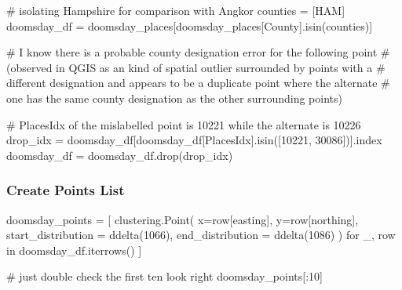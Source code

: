 \documentclass[
  11pt,
  letterpaper,
  DIV=11,
  numbers=noendperiod]{scrartcl}
\newenvironment{Shaded}{\begin{snugshade}}{\end{snugshade}}
\newcommand{\CommentTok}[1]{\textcolor[rgb]{0.37,0.37,0.37}{#1}}
\newcommand{\ControlFlowTok}[1]{\textcolor[rgb]{0.00,0.23,0.31}{#1}}
\newcommand{\DecValTok}[1]{\textcolor[rgb]{0.68,0.00,0.00}{#1}}
\newcommand{\KeywordTok}[1]{\textcolor[rgb]{0.00,0.23,0.31}{#1}}
\newcommand{\NormalTok}[1]{\textcolor[rgb]{0.00,0.23,0.31}{#1}}
\newcommand{\OperatorTok}[1]{\textcolor[rgb]{0.37,0.37,0.37}{#1}}
\newcommand{\StringTok}[1]{\textcolor[rgb]{0.13,0.47,0.30}{#1}}
\begin{document}
\begin{Shaded}
\begin{Highlighting}[]
\CommentTok{\# isolating Hampshire for comparison with Angkor}
\NormalTok{counties }\OperatorTok{=}\NormalTok{ [}\StringTok{\textquotesingle{}HAM\textquotesingle{}}\NormalTok{]}
\NormalTok{doomsday\_df }\OperatorTok{=}\NormalTok{ doomsday\_places[doomsday\_places[}\StringTok{\textquotesingle{}County\textquotesingle{}}\NormalTok{].isin(counties)]}

\CommentTok{\# I know there is a probable county designation error for the following point }
\CommentTok{\# (observed in QGIS as an kind of spatial outlier surrounded by points  with a }
\CommentTok{\# different designation and appears to be a duplicate point where the alternate }
\CommentTok{\# one has the same county designation as the other surrounding points)}

\CommentTok{\# PlacesIdx of the mislabelled point is 10221 while the alternate is 10226}
\NormalTok{drop\_idx }\OperatorTok{=}\NormalTok{ doomsday\_df[doomsday\_df[}\StringTok{\textquotesingle{}PlacesIdx\textquotesingle{}}\NormalTok{].isin([}\DecValTok{10221}\NormalTok{, }\DecValTok{30086}\NormalTok{])].index}
\NormalTok{doomsday\_df }\OperatorTok{=}\NormalTok{ doomsday\_df.drop(drop\_idx)}
\end{Highlighting}
\end{Shaded}

\subsubsection{Create Points List}\label{create-points-list-1}

\begin{Shaded}
\begin{Highlighting}[]
\NormalTok{doomsday\_points }\OperatorTok{=}\NormalTok{ [}
\NormalTok{    clustering.Point(}
\NormalTok{        x}\OperatorTok{=}\NormalTok{row[}\StringTok{\textquotesingle{}easting\textquotesingle{}}\NormalTok{],}
\NormalTok{        y}\OperatorTok{=}\NormalTok{row[}\StringTok{\textquotesingle{}northing\textquotesingle{}}\NormalTok{],}
\NormalTok{        start\_distribution }\OperatorTok{=}\NormalTok{ ddelta(}\DecValTok{1066}\NormalTok{),}
\NormalTok{        end\_distribution }\OperatorTok{=}\NormalTok{ ddelta(}\DecValTok{1086}\NormalTok{)}
\NormalTok{    )}
    \ControlFlowTok{for}\NormalTok{ \_, row }\KeywordTok{in}\NormalTok{ doomsday\_df.iterrows()}
\NormalTok{]}

\CommentTok{\# just double check the first ten look right}
\NormalTok{doomsday\_points[:}\DecValTok{10}\NormalTok{]}
\end{Highlighting}
\end{Shaded}
\end{document}
